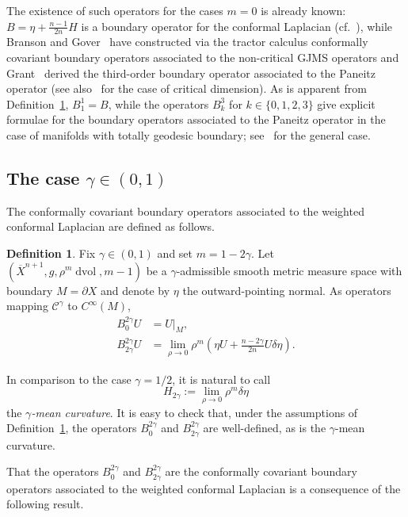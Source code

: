 \documentclass{amsart}
\theoremstyle{definition}
\newtheorem{defn}[thm]{Definition}
\theoremstyle{remark}
\numberwithin{equation}{section}
\begin{document}
The existence of such operators for the cases $m=0$ is already known: $B=\eta+\frac{n-1}{2n}H$ is a boundary operator for the conformal Laplacian (cf.\ \cite{Branson1997,Escobar1990}), while Branson and Gover~\cite{BransonGover2001} have constructed via the tractor calculus conformally covariant boundary operators associated to the non-critical GJMS operators and Grant~\cite{Grant2003} derived the third-order boundary operator associated to the Paneitz operator (see also~\cite{ChangQing1997a,Juhl2009} for the case of critical dimension).  As is apparent from Definition~\ref{defn:operators0}, $B_1^1=B$, while the operators $B_k^3$ for $k\in\{0,1,2,3\}$ give explicit formulae for the boundary operators associated to the Paneitz operator in the case of manifolds with totally geodesic boundary; see~\cite{Case2015b} for the general case.

\subsection{The case $\gamma\in(0,1)$}
\label{subsec:boundary/1}

The conformally covariant boundary operators associated to the weighted conformal Laplacian are defined as follows.

\begin{defn}
 \label{defn:operators0}
 Fix $\gamma\in(0,1)$ and set $m=1-2\gamma$.  Let $({\overline{X}}^{n+1},g,\rho^m\operatorname{dvol},m-1)$ be a $\gamma$-admissible smooth metric measure space with boundary $M=\partial X$ and denote by $\eta$ the outward-pointing normal.  As operators mapping ${\mathcal{C}}^\gamma$ to $C^\infty(M)$,
 \begin{align*}
  B_0^{2\gamma}U & = U{\rvert}_M , \\
  B_{2\gamma}^{2\gamma}U & = \lim_{\rho\to0} \rho^m\left(\eta U + \frac{n-2\gamma}{2n}U\delta\eta\right) .
 \end{align*}
\end{defn}

In comparison to the case $\gamma=1/2$, it is natural to call
\[ H_{2\gamma} := \lim_{\rho\to0} \rho^m\delta\eta \]
the \emph{$\gamma$-mean curvature}.  It is easy to check that, under the assumptions of Definition~\ref{defn:operators0}, the operators $B_{0}^{2\gamma}$ and $B_{2\gamma}^{2\gamma}$ are well-defined, as is the $\gamma$-mean curvature.

That the operators $B_{0}^{2\gamma}$ and $B_{2\gamma}^{2\gamma}$ are the conformally covariant boundary operators associated to the weighted conformal Laplacian is a consequence of the following result.
\end{document}
